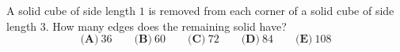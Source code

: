 A solid cube of side length $1$ is removed from each corner of a solid cube of side length $3$. How many edges does the remaining solid have?
\[\textbf{(A)}\ 36\qquad\textbf{(B)}\ 60\qquad\textbf{(C)}\ 72\qquad\textbf{(D)}\ 84\qquad\textbf{(E)}\ 108\]
